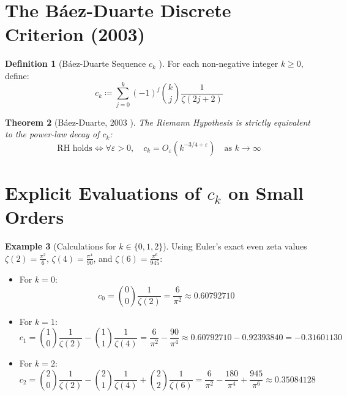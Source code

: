 \documentclass[11pt,a4paper]{article}
\newtheorem{theorem}{Theorem}[section]
\theoremstyle{definition}
\newtheorem{definition}[theorem]{Definition}
\newtheorem{example}[theorem]{Example}
\begin{document}
\section{The B\'aez-Duarte Discrete Criterion (2003)}

\begin{definition}[B\'aez-Duarte Sequence $c_k$ \cite{baez_duarte2003}]\label{def:baez_duarte_ck}
For each non-negative integer $k \ge 0$, define:
\begin{equation}\label{eq:ck_def}
c_k \coloneqq \sum_{j=0}^k (-1)^j \binom{k}{j} \frac{1}{\zeta(2j + 2)}
\end{equation}
\end{definition}

\begin{theorem}[B\'aez-Duarte, 2003 \cite{baez_duarte2003}]\label{thm:baez_duarte_main}
The Riemann Hypothesis is strictly equivalent to the power-law decay of $c_k$:
\begin{equation}\label{eq:baez_duarte_equiv}
\text{RH holds} \iff \forall \varepsilon > 0, \quad c_k = O_\varepsilon\left( k^{-3/4 + \varepsilon} \right) \quad \text{as } k \to \infty
\end{equation}
\end{theorem}

\section{Explicit Evaluations of $c_k$ on Small Orders}

\begin{example}[Calculations for $k \in \{0, 1, 2\}$]\label{ex:baez_evals}
Using Euler's exact even zeta values $\zeta(2) = \frac{\pi^2}{6}$, $\zeta(4) = \frac{\pi^4}{90}$, and $\zeta(6) = \frac{\pi^6}{945}$:
\begin{itemize}
    \item For $k = 0$:
    \[ c_0 = \binom{0}{0} \frac{1}{\zeta(2)} = \frac{6}{\pi^2} \approx 0.60792710 \]
    \item For $k = 1$:
    \[ c_1 = \binom{1}{0} \frac{1}{\zeta(2)} - \binom{1}{1} \frac{1}{\zeta(4)} = \frac{6}{\pi^2} - \frac{90}{\pi^4} \approx 0.60792710 - 0.92393840 = -0.31601130 \]
    \item For $k = 2$:
    \[ c_2 = \binom{2}{0} \frac{1}{\zeta(2)} - \binom{2}{1} \frac{1}{\zeta(4)} + \binom{2}{2} \frac{1}{\zeta(6)} = \frac{6}{\pi^2} - \frac{180}{\pi^4} + \frac{945}{\pi^6} \approx 0.35084128 \]
\end{itemize}
\end{example}
\end{document}
